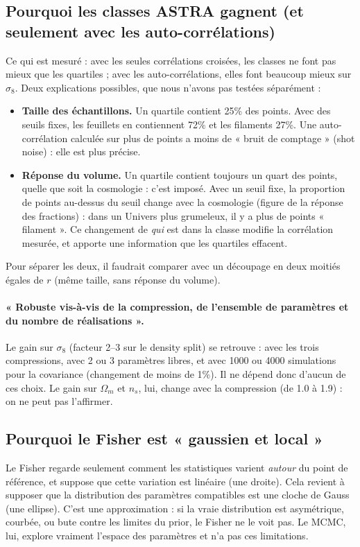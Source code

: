 \subsection{Pourquoi les classes ASTRA gagnent (et seulement avec les auto-corrélations)}
Ce qui est mesuré : avec les seules corrélations croisées, les classes ne font pas mieux que les quartiles ; avec les auto-corrélations, elles font beaucoup mieux sur $\sigma_8$. Deux explications possibles, que nous n'avons pas testées séparément :
\begin{itemize}
\item \textbf{Taille des échantillons.} Un quartile contient 25\% des points. Avec des seuils fixes, les feuillets en contiennent 72\% et les filaments 27\%. Une auto-corrélation calculée sur plus de points a moins de « bruit de comptage » (shot noise) : elle est plus précise.
\item \textbf{Réponse du volume.} Un quartile contient toujours un quart des points, quelle que soit la cosmologie : c'est imposé. Avec un seuil fixe, la proportion de points au-dessus du seuil change avec la cosmologie (figure de la réponse des fractions) : dans un Univers plus grumeleux, il y a plus de points « filament ». Ce changement de \emph{qui} est dans la classe modifie la corrélation mesurée, et apporte une information que les quartiles effacent.
\end{itemize}
Pour séparer les deux, il faudrait comparer avec un découpage en deux moitiés égales de $r$ (même taille, sans réponse du volume).

\paragraph{« Robuste vis-à-vis de la compression, de l'ensemble de paramètres et du nombre de réalisations ».} Le gain sur $\sigma_8$ (facteur 2--3 sur le density split) se retrouve : avec les trois compressions, avec 2 ou 3 paramètres libres, et avec 1000 ou 4000 simulations pour la covariance (changement de moins de 1\%). Il ne dépend donc d'aucun de ces choix. Le gain sur $\Omega_m$ et $n_s$, lui, change avec la compression (de 1.0 à 1.9) : on ne peut pas l'affirmer.

\subsection{Pourquoi le Fisher est « gaussien et local »}
Le Fisher regarde seulement comment les statistiques varient \emph{autour} du point de référence, et suppose que cette variation est linéaire (une droite). Cela revient à supposer que la distribution des paramètres compatibles est une cloche de Gauss (une ellipse). C'est une approximation : si la vraie distribution est asymétrique, courbée, ou bute contre les limites du prior, le Fisher ne le voit pas. Le MCMC, lui, explore vraiment l'espace des paramètres et n'a pas ces limitations.

